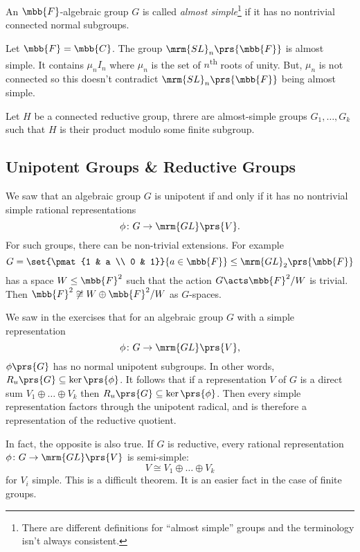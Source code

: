 \documentclass[10pt,a4paper,twoside,openany,hidelinks]{book}
\begin{document}
\begin{definition}
An $\mbb{F}$-algebraic group $G$ is called \emph{almost simple}\footnote{There are different definitions for ``almost simple'' groups and the terminology isn't always consistent.} if it has no nontrivial connected normal subgroups.
\end{definition}

\begin{example}
Let $\mbb{F} = \mbb{C}$. The group $\mrm{SL}_n\prs{\mbb{F}}$ is almost simple. It contains $\mu_n I_n$ where $\mu_n$ is the set of $n$\textsuperscript{th} roots of unity. But, $\mu_n$ is not connected so this doesn't contradict $\mrm{SL}_n\prs{\mbb{F}}$ being almost simple.
\end{example}

Let $H$ be a connected reductive group, threre are almost-simple groups $G_1, \ldots, G_k$ such that $H$ is their product modulo some finite subgroup.

\subsection{Unipotent Groups \& Reductive Groups}

We saw that an algebraic group $G$ is unipotent if and only if it has no nontrivial simple rational representations
\[\phi \colon G \to \mrm{GL}\prs{V} \text{.}\]
For such groups, there can be non-trivial extensions. For example
\[G = \set{\pmat{1 & a \\ 0 & 1}}{a \in \mbb{F}} \leq \mrm{GL}_2\prs{\mbb{F}}\]
has a space $W \leq \mbb{F}^2$ such that the action $G \acts \mbb{F}^2 / W$ is trivial. Then $\mbb{F}^2 \not\cong W \oplus \mbb{F}^2/W$ as $G$-spaces.

We saw in the exercises that for an algebraic group $G$ with a simple representation
\[\phi \colon G \to \mrm{GL}\prs{V}\text{,}\]
$\phi\prs{G}$ has no normal unipotent subgroups.
In other words,
$R_u\prs{G} \subseteq \ker\prs{\phi}$.
It follows that if a representation $V$ of $G$ is a direct sum $V_1 \oplus \ldots \oplus V_k$ then $R_u\prs{G} \subseteq \ker\prs{\phi}$.
Then every simple representation factors through the unipotent radical, and is therefore a representation of the reductive quotient.

In fact, the opposite is also true. If $G$ is reductive, every rational representation $\phi \colon G \to \mrm{GL}\prs{V}$ is semi-simple:
\[V \cong V_1 \oplus \ldots \oplus V_k\]
for $V_i$ simple.
This is a difficult theorem.
It is an easier fact in the case of finite groups.
\end{document}
